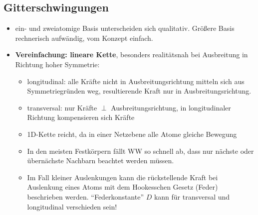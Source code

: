 \documentclass[a4paper,12pt]{article}
\begin{document}
\subsection{Gitterschwingungen}
\begin{itemize}
	\item ein- und zweiatomige Basis unterscheiden sich qualitativ. Größere Basis rechnerisch aufwändig, vom Konzept einfach.
	\item \textbf{Vereinfachung: lineare Kette}, besonders realitätsnah  bei Ausbreitung in Richtung hoher Symmetrie: \begin{itemize}
		\item longitudinal: alle Kräfte nicht in Ausbreitungsrichtung mitteln sich aus Symmetriegründen weg, resultierende Kraft nur in Ausbreitungsrichtung.
		\item transversal: nur Kräfte $ \perp $ Ausbreitungsrichtung, in longitudinaler Richtung kompensieren sich Kräfte
		\item 1D-Kette reicht, da in einer Netzebene alle Atome gleiche Bewegung
		\item In den meisten Festkörpern fällt WW so schnell ab, dass nur nächste oder übernächste Nachbarn beachtet werden müssen.
		\item Im Fall kleiner Auslenkungen kann die rückstellende Kraft bei Auslenkung eines Atoms mit dem Hookesschen Gesetz (Feder) beschrieben werden.  \enquote{Federkonstante} $ D $ kann für transversal und longitudinal verschieden sein!
	\end{itemize}
\end{itemize}
\end{document}
